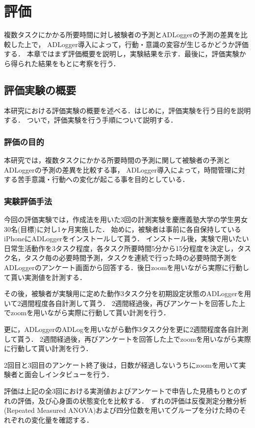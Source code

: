 \chapter{評価}
複数タスクにかかる所要時間に対し被験者の予測とADLoggerの予測の差異を比較した上で，
ADLogger導入によって，行動・意識の変容が生じるかどうか評価する．
本章ではまず評価概要を説明し，実験結果を示す．最後に，評価実験から得られた結果をもとに考察を行う．

\section{評価実験の概要}
本研究における評価実験の概要を述べる．はじめに，評価実験を行う目的を説明する．
ついで，評価実験を行う手順について説明する．

\subsection{評価の目的}
本研究では，複数タスクにかかる所要時間の予測に関して被験者の予測とADLoggerの予測の差異を比較する事，
ADLogger導入によって，時間管理に対する苦手意識・行動への変化が起こる事を目的としている．

\subsection{実験評価手法}
今回の評価実験では，作成法\cite{Oguro1961}\cite{Tayama2018}を用いた3回の計測実験を慶應義塾大学の学生男女30名(目標)に対し1ヶ月実施した．
始めに，被験者は事前に各自保持しているiPhoneにADLoggerをインストールして貰う．
インストール後，実験で用いたい日常生活動作を3タスク程度，各タスク所要時間5分から15分程度を決定し，タスク名，タスク毎の必要時間予測，タスクを連続で行った時の必要時間予測をADLoggerのアンケート画面から回答する．後日zoom\cite{zoom}を用いながら実際に行動して貰い実測値を計測する．

その後，被験者が実験用に定めた動作3タスク分を初期設定状態のADLoggerを用いて2週間程度各自計測して貰う．
2週間経過後，再びアンケートを回答した上でzoom\cite{zoom}を用いながら実際に行動して貰い計測を行う．

更に，ADLoggerのADLogを用いながら動作3タスク分を更に2週間程度各自計測して貰う．
2週間経過後，再びアンケートを回答した上でzoom\cite{zoom}を用いながら実際に行動して貰い計測を行う．

2回目と3回目のアンケート終了後は，日数が経過しないうちにzoom\cite{zoom}を用いて実験者と面会しインタビューを行う．

評価は上記の全3回における実測値およびアンケートで申告した見積もりとのずれの評価，及び心身面の状態変化を比較する．
ずれの評価は反復測定分散分析(Repeated Measured ANOVA)および四分位数を用いてグループを分けた時のそれぞれの変化量を確認する．

